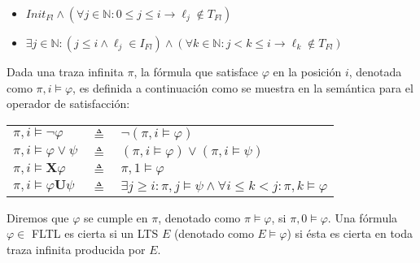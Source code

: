 \begin{itemize}
    \item $Init_{Fl} \land (\forall j \in \mathbb{N}: 0 \leq j \leq i \rightarrow \ell_j \notin T_{Fl} )$
    \item $\exists j \in \mathbb{N}: (j \leq i \land \ell_j \in I_{Fl}) \land (\forall k \in \mathbb{N}: j < k \leq i
    \rightarrow \ell_k \notin T_{Fl})$
\end{itemize}

\noindent Dada una traza infinita $\pi$, la fórmula que satisface $\varphi$ en la posición $i$, denotada como $\pi,i
\vDash \varphi$, es definida a continuación como se muestra en la semántica para el operador de satisfacción:

\begin{center}
\begin{tabular}{p{2cm}p{0.5cm}l}
    $\pi,i \vDash \neg\varphi$              & $\triangleq$    & $\neg(\pi,i \vDash \varphi)$\\
    $\pi,i \vDash \varphi \lor \psi$         & $\triangleq$    & $(\pi,i\vDash\varphi)\lor(\pi,i\vDash\psi)$\\
    $\pi,i \vDash \mathbf{X}\varphi$         & $\triangleq$    & $\pi,1 \vDash \varphi$\\
    $\pi,i \vDash \varphi\mathbf{U}\psi$  & $\triangleq$    & $\exists j \geq i: \pi,j \vDash \psi\land\forall i \leq k < j:
    \pi,k \vDash \varphi$
\end{tabular}
\end{center}

Diremos que $\varphi$ se cumple en $\pi$, denotado como $\pi \vDash \varphi$, si $\pi,0 \vDash \varphi$. Una fórmula
$\varphi \in$ FLTL es cierta si un LTS $E$ (denotado como $E \vDash \varphi$) si ésta es cierta en toda traza infinita
producida por $E$. 
